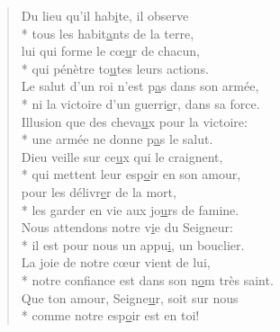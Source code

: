 \begin{verse}
Du lieu qu’il hab\underline{i}te, il observe \\*
tous les habit\underline{a}nts de la terre, \\
lui qui forme le cœ\underline{u}r de chacun, \\*
qui pénètre to\underline{u}tes leurs actions. \\

Le salut d’un roi n’est p\underline{a}s dans son armée, \\*
ni la victoire d’un guerri\underline{e}r, dans sa force. \\
Illusion que des cheva\underline{u}x pour la victoire: \\*
une armée ne donne p\underline{a}s le salut. \\

Dieu veille sur ce\underline{u}x qui le craignent, \\*
qui mettent leur esp\underline{o}ir en son amour, \\
pour les délivr\underline{e}r de la mort, \\*
les garder en vie aux jo\underline{u}rs de famine. \\

Nous attendons notre v\underline{i}e du Seigneur: \\*
il est pour nous un appu\underline{i}, un bouclier. \\
La joie de notre cœur vient de lui, \\*
notre confiance est dans son n\underline{o}m très saint. \\

Que ton amour, Seigne\underline{u}r, soit sur nous \\*
comme notre esp\underline{o}ir est en toi! \\
\end{verse}

